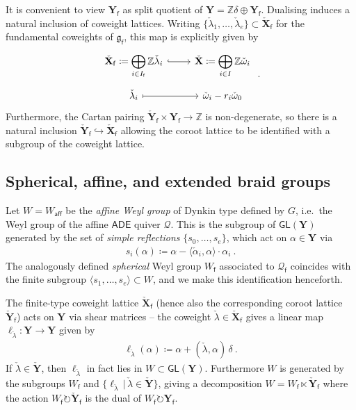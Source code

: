 \documentclass[reqno,a4paper]{amsart}
\newcommand{\Z}{\mathbb{Z}}
\newcommand{\sff}{\mathsf{f}}
\newcommand{\frakg}{\mathfrak{g}}
\newcommand{\bfY}{\mathbf{Y}}
\newcommand{\bfX}{\mathbf{X}}
\newcommand{\qv}{\mathcal{Q}}
\newcommand{\qvfin}{\mathcal{Q}_\sff}
\newcommand{\Lalpha}{\check{\alpha}}
\newcommand{\Lomega}{\check{\omega}}
\newcommand{\Llambda}{{\check{\lambda}}}
\newcommand{\rootlattice}{\bfY}
\newcommand{\corootlattice}{\check{\bfY}}
\newcommand{\rootlatticefin}{\rootlattice_\sff}
\newcommand{\corootlatticefin}{\check{\rootlattice}_\sff}
\newcommand{\weightlattice}{\bfX}
\newcommand{\coweightlattice}{\check{\weightlattice}}
\newcommand{\coweightlatticefin}{\coweightlattice_\sff}
\newcommand{\frakgfin}{\frakg_\sff}
\newcommand{\GL}{\mathsf{GL}}
\theoremstyle{basic-theorem}
\numberwithin{equation}{section}
\begin{document}
It is convenient to view $\rootlatticefin$ as split quotient of $\rootlattice= \Z\delta \oplus \rootlatticefin$. Dualising induces a natural inclusion of coweight lattices. Writing $\{\Llambda_1,\ldots,\Llambda_e\}\subset \coweightlatticefin$ for the fundamental coweights of $\frakgfin$, this map is explicitly given by
\begin{align}\label{eq:Lthetaconditions}
	\begin{tikzcd}[ampersand replacement=\&, row sep=tiny]
		\coweightlatticefin \coloneqq \displaystyle \bigoplus_{i\in I_\sff} \Z\Llambda_i \ar[hook]{r} \& \coweightlattice\coloneqq \displaystyle\bigoplus_{i\in I}\Z\Lomega_i\\
		\Llambda_i \ar[mapsto]{r} \&\Lomega_i - r_i \Lomega_0
	\end{tikzcd}\ .
\end{align}
Furthermore, the Cartan pairing $\corootlatticefin\times\rootlatticefin\to \Z$ is non-degenerate, so there is a natural inclusion $\corootlatticefin \hookrightarrow \coweightlatticefin$ allowing the coroot lattice to be identified with a subgroup of the coweight lattice.


\subsection{Spherical, affine, and extended braid groups}\label{subsec:braid-group-affine-quiver}

Let $W=W_{\mathsf{aff}}$ be the \textit{affine Weyl group} of Dynkin type defined by $G$, i.e.\ the Weyl group of the affine $\mathsf{ADE}$ quiver $\qv$. This is the subgroup of $\GL(\rootlattice)$ generated by the set of \textit{simple reflections} $\{s_0,\ldots,s_e\}$, which act on $\alpha\in \rootlattice$ via
\begin{align}
	s_i(\alpha) \coloneqq \alpha - \langle \Lalpha_i,\alpha \rangle \cdot \alpha_i\ .
\end{align}
The analogously defined \textit{spherical} Weyl group $W_\sff$ associated to $\qvfin$ coincides with the finite subgroup $\langle s_1,\ldots,s_e \rangle \subset W$, and we make this identification henceforth.

The finite-type coweight lattice $\coweightlatticefin$ (hence also the corresponding coroot lattice $\corootlatticefin$) acts on $\rootlattice$ via shear matrices -- the coweight $\Llambda\in \coweightlatticefin$ gives a linear map $\ell_{\Llambda}\colon \rootlattice\to\rootlattice$ given by
\begin{align}\label{eq:ell_Llambda}
	\ell_{\Llambda}(\alpha)\coloneqq\alpha+(\Llambda,\alpha)\,\delta\ .
\end{align}
If $\Llambda\in\corootlattice$, then $\ell_{\Llambda}$ in fact lies in $W\subset \GL(\rootlattice)$. Furthermore $W$ is generated by the subgroups $W_\sff$ and $\{\ell_{\Llambda}\,\vert\, \Llambda\in\corootlattice\}$, giving a decomposition $W=W_\sff\ltimes \corootlatticefin$ where the action $W_\sff\circlearrowright\corootlatticefin$ is the dual of $W_\sff\circlearrowright \rootlatticefin$.
\end{document}
